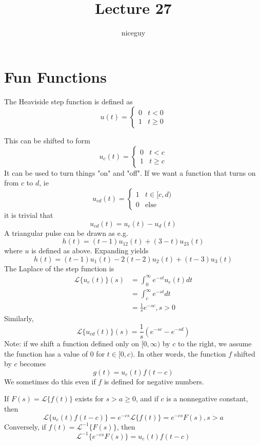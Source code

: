 \documentclass[12pt]{article}
\title{Lecture 27}
\author{niceguy}
\begin{document}
\maketitle

\section{Fun Functions}

\begin{defn}
	The Heaviside step function is defined as
	$$u(t) = \begin{cases} 0 & t < 0 \\ 1 & t \geq 0\end{cases}$$
\end{defn}
This can be shifted to form
$$u_c(t) = \begin{cases} 0 & t < c \\ 1 & t \geq c\end{cases}$$
It can be used to turn things "on" and "off". If we want a function that turns on from $c$ to $d$, ie
$$u_{cd}(t) = \begin{cases} 1 & t \in[c,d) \\ 0 & \text{else}\end{cases}$$
it is trivial that
$$u_{cd}(t) = u_c(t) - u_d(t)$$
A triangular pulse can be drawn as e.g.
$$h(t) = (t-1)u_{12}(t) + (3-t)u_{23}(t)$$
where $u$ is defined as above. Expanding yields
$$h(t) = (t-1)u_1(t) - 2(t-2)u_2(t) + (t-3)u_3(t)$$
The Laplace of the step function is
\begin{align*}
	\mathcal{L}\{u_c(t)\}(s) &= \int_0^\infty e^{-st}u_c(t)dt \\
				 &= \int_c^\infty e^{-st}dt \\
				 &= \frac{1}{s}e^{-sc}, s > 0
\end{align*}
Similarly,
$$\mathcal{L}\{u_{cd}(t)\}(s) = \frac{1}{s}\left(e^{-sc} - e^{-sd}\right)$$
Note: if we shift a function defined only on $[0,\infty)$ by $c$ to the right, we assume the function has a value of 0 for $t \in [0,c)$. In other words, the function $f$ shifted by $c$ becomes
$$g(t) = u_c(t)f(t-c)$$
We sometimes do this even if $f$ is defined for negative numbers.

\begin{thm}
	If $F(s) = \mathcal{L}\{f(t)\}$ exists for $s > a \geq 0$, and if $c$ is a nonnegative constant, then
	$$\mathcal{L}\{u_c(t)f(t-c)\} = e^{-cs}\mathcal{L}\{f(t)\} = e^{-cs}F(s), s > a$$
	Conversely, if $f(t) = \mathcal{L}^{-1}\{F(s)\}$, then
	$$\mathcal{L}^{-1}\{e^{-cs}F(s)\} = u_c(t)f(t-c)$$
\end{thm}
\end{document}
